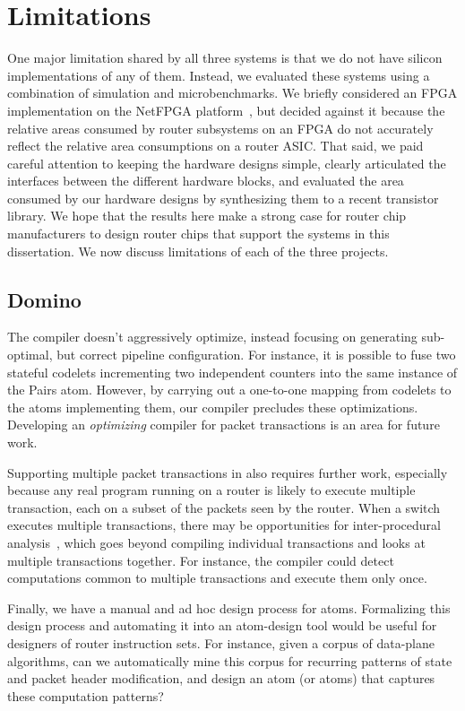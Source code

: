 \chapter{Limitations}
\label{chap:limitations}

One major limitation shared by all three systems is that we do not have silicon
implementations of any of them. Instead, we evaluated these systems using a
combination of simulation and microbenchmarks. We briefly considered an FPGA
implementation on the NetFPGA platform~\cite{netfpga}, but decided against it
because the relative areas consumed by router subsystems on an FPGA do not
accurately reflect the relative area consumptions on a router ASIC.  That said,
we paid careful attention to keeping the hardware designs simple, clearly
articulated the interfaces between the different hardware blocks, and evaluated
the area consumed by our hardware designs by synthesizing them to a recent
transistor library. We hope that the results here make a strong case for router
chip manufacturers to design router chips that support the systems in this
dissertation. We now discuss limitations of each of the three projects.

\section{Domino}
\label{sec:domino_limitations}
The \pktlanguage compiler doesn't aggressively optimize, instead focusing on
generating sub-optimal, but correct pipeline configuration. For instance, it is
possible to fuse two stateful codelets incrementing two independent counters
into the same instance of the Pairs atom. However, by carrying out a one-to-one
mapping from codelets to the atoms implementing them, our compiler precludes
these optimizations.  Developing an {\em optimizing} compiler for packet
transactions is an area for future work.

Supporting multiple packet transactions in \pktlanguage also requires further
work, especially because any real program running on a router is likely to
execute multiple transaction, each on a subset of the packets seen by the
router. When a switch executes multiple transactions, there may be
opportunities for inter-procedural analysis~\cite{dragonbook}, which goes
beyond compiling individual transactions and looks at multiple transactions
together.  For instance, the compiler could detect computations common to
multiple transactions and execute them only once.

Finally, we have a manual and ad hoc design process for atoms.  Formalizing
this design process and automating it into an atom-design tool would be useful
for designers of router instruction sets. For instance, given a corpus of
data-plane algorithms, can we automatically mine this corpus for recurring
patterns of state and packet header modification, and design an atom (or atoms)
that captures these computation patterns?

